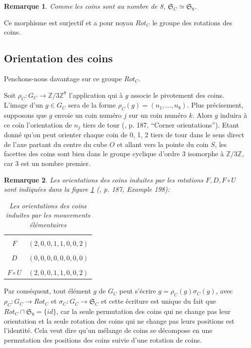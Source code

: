 \documentclass[french]{report}
\newtheorem*{remark}{Remarque}
\begin{document}
\begin{remark}
Comme les coins sont au nombre de 8, $\mathfrak{S}_{C} \simeq \mathfrak{S}_{8}  $.
\end{remark}

Ce morphisme est surjectif et a pour noyau $Rot_C$ le groupe des rotations des coins.

\subsection{Orientation des coins}

Penchons-nous davantage sur ce groupe $Rot_C$.

Soit $\rho_C  : G_C \to \mathbb{Z}/{ 3 }\mathbb{Z} ^{8}$ l'application qui à $g$ associe le pivotement des coins. L'image d'un $g \in G_C$ sera de la forme $ \rho_C (g) = (n_1, \dots, n_8)$. Plus précisement, supposons que $g$ envoie un coin numéro $j$ sur un coin numéro $k$. Alors $g$ induira à ce coin l'orientation de $n_j$ tiers de tour (\cite{math_rubik}, p. 187, ``Corner orientations''). Etant donné qu'on peut orienter chaque coin de 0, 1, 2 tiers de tour dans le sens direct de l'axe partant du centre du cube $O$ et allant vers la pointe du coin $S$, les facettes des coins sont bien dans le groupe cyclique d'ordre 3 isomorphe à $\mathbb{Z}/{ 3 }\mathbb{Z}$, car 3 est un nombre premier.

\begin{remark}
  Les orientations des coins induites par les rotations $F, D, F \circ U$ sont indiquées dans la figure \ref{tableau_orientations} (\cite{math_rubik}, p. 187, Example 198):
\begin{table}[h!]
  \centering
  \begin{tabular}{|c|c|}
    \hline \\
    $ F$ & $(2,0,0,1,1,0,0,2)$ \\
    \hline \\
    $D$ & $(0,0,0,0,0,0,0,0)$  \\
    \hline \\
    $F \circ U$ & $ (2,0,0,1,1,0,0,2)$ \\
    \hline
  \end{tabular}
  \caption{Les orientations des coins induites par les mouvements élémentaires}
  \label{tableau_orientations}
\end{table}

\end{remark}

Par conséquent, tout élément $g$ de $G_C$ peut s'écrire $g = \rho_C(g) \sigma_C(g)$, avec $\rho_C : G_C \to Rot_C$ et $\sigma_C : G_C \to  \mathfrak{S}_{C} $ et cette écriture est unique du fait que $Rot_C \cap \mathfrak{S}_{8} = \{ id \} $, car la seule permutation des coins qui ne change pas leur orientation et la seule rotation des coins qui ne change pas leurs positions est l'identité. Cela veut dire qu'un mélange de coins se décompose en une permutation des positions des coins suivie d'une rotation de coins.
\end{document}
